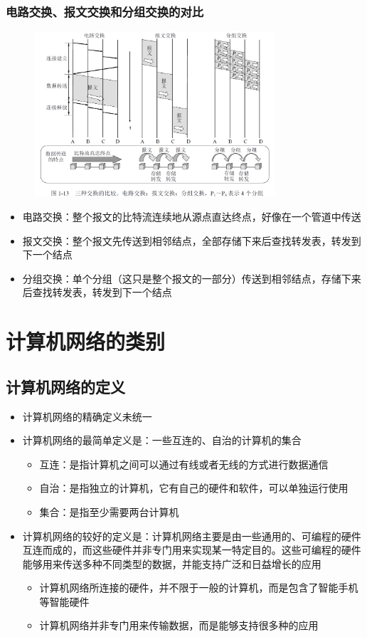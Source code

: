 \documentclass[cs4size,a4paper,10pt]{ctexart}
\begin{document}
	\subsubsection{电路交换、报文交换和分组交换的对比}
	\begin{figure}[H]
		\centering
		\includegraphics[width=0.8\textwidth]{img/1.13}
	\end{figure}
	\begin{itemize}
		\item 电路交换：整个报文的比特流连续地从源点直达终点，好像在一个管道中传送
		\item 报文交换：整个报文先传送到相邻结点，全部存储下来后查找转发表，转发到下一个结点
		\item 分组交换：单个分组（这只是整个报文的一部分）传送到相邻结点，存储下来后查找转发表，转发到下一个结点
	\end{itemize}

	\section{计算机网络的类别}

	\subsection{计算机网络的定义}
	\begin{itemize}
		\item 计算机网络的精确定义未统一
		\item 计算机网络的最简单定义是：一些互连的、自治的计算机的集合
		\begin{itemize}
			\item 互连：是指计算机之间可以通过有线或者无线的方式进行数据通信
			\item 自治：是指独立的计算机，它有自己的硬件和软件，可以单独运行使用
			\item 集合：是指至少需要两台计算机
		\end{itemize}
		\item 计算机网络的较好的定义是：计算机网络主要是由一些通用的、可编程的硬件互连而成的，而这些硬件并非专门用来实现某一特定目的。这些可编程的硬件能够用来传送多种不同类型的数据，并能支持广泛和日益增长的应用
		\begin{itemize}
			\item 计算机网络所连接的硬件，并不限于一般的计算机，而是包含了智能手机等智能硬件
			\item 计算机网络并非专门用来传输数据，而是能够支持很多种的应用
		\end{itemize}
	\end{itemize}
\end{document}
